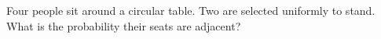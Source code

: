 Four people sit around a circular table. Two are selected uniformly to stand. What is the probability their seats are adjacent?
